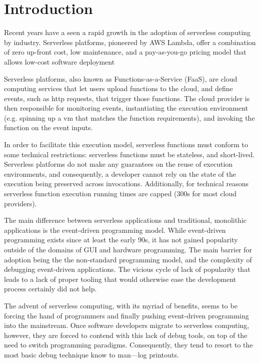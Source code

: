 \section{Introduction}

Recent years have a seen a rapid growth in the adoption of serverless computing
by industry. Serverless platforms, pioneered by AWS Lambda, offer a combination
of zero up-front cost, low maintenance, and a pay-as-you-go pricing model that
allows low-cost software deployment %

Serverless platforms, also known as Functions-as-a-Service (FaaS), are cloud
computing services that let users upload functions to the cloud, and define
events, such as http requests, that trigger those functions. The cloud provider
is then responsible for monitoring events, instantiating the execution
environment (e.g. spinning up a vm that matches the function requirements), and
invoking the function on the event inputs. 

In order to facilitate this execution model, serverless functions must conform
to some technical restrictions: serverless functions must be stateless, and
short-lived. Serverless platforms do not make any guarantees on the reuse of
execution environments, and consequently, a developer cannot rely on the state
of the execution being preserved across invocations. Additionally, for technical
reasons serverless function execution running times are capped (300s for most
cloud providers).

The main difference between serverless applications and traditional, monolithic
applications is the event-driven programming model. While event-driven
programming exists since at least the early 90s, it has not gained popularity
outside of the domains of GUI and hardware programming. The main barrier for
adoption being the the non-standard programming model, and the complexity of
debugging event-driven applications. The vicious cycle of lack of popularity
that leads to a lack of proper tooling that would otherwise ease the development
process certainly did not help.

The advent of serverless computing, with its myriad of benefits, seems to be
forcing the hand of programmers and finally pushing event-driven programming
into the mainstream. Once software developers migrate to serverless computing,
however, they are forced to contend with this lack of debug tools, on top of the
need to switch programming paradigms. Consequently, they tend to resort to the
most basic debug technique know to man---log printouts.



%
%
%
%

%
%
%
%
